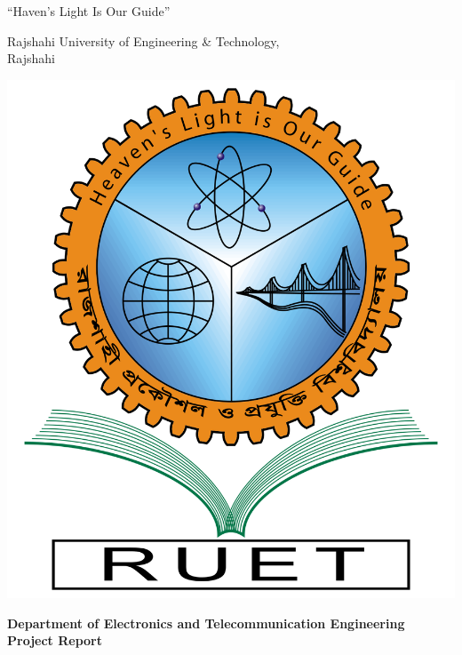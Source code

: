 
\begin{titlepage}
    \begin{center}
        ``Haven's Light Is Our Guide''\\

        \vspace{0.5cm}

        \begin{huge}
            Rajshahi University of Engineering \& Technology,\\
            Rajshahi\\
        \end{huge}

        \vspace{0.5cm}

        \includegraphics[scale=.18]{images/ruet_logo.png}
        \\
        \vspace{.5cm}

        \begin{Large}
            \textbf{Department of Electronics and Telecommunication Engineering}\\
            \huge
            \textbf{Project Report} \\
        \end{Large}


\end{center}
\end{titlepage}
